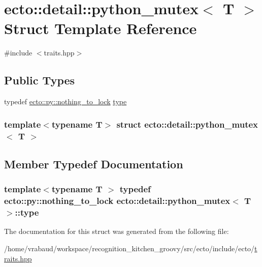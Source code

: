 \hypertarget{structecto_1_1detail_1_1python__mutex}{\section{ecto\-:\-:detail\-:\-:python\-\_\-mutex$<$ \-T $>$ \-Struct \-Template \-Reference}
\label{structecto_1_1detail_1_1python__mutex}
}


{\ttfamily \#include $<$traits.\-hpp$>$}

\subsection*{\-Public \-Types}
\begin{DoxyCompactItemize}
\item 
typedef \hyperlink{classecto_1_1py_1_1nothing__to__lock}{ecto\-::py\-::nothing\-\_\-to\-\_\-lock} \hyperlink{structecto_1_1detail_1_1python__mutex_af0a9d3c8b5d8ad0e8f8584101a197fa5}{type}
\end{DoxyCompactItemize}
\subsubsection*{template$<$typename T$>$ struct ecto\-::detail\-::python\-\_\-mutex$<$ T $>$}



\subsection{\-Member \-Typedef \-Documentation}
\hypertarget{structecto_1_1detail_1_1python__mutex_af0a9d3c8b5d8ad0e8f8584101a197fa5}{
\subsubsection[{type}]{\setlength{\rightskip}{0pt plus 5cm}template$<$typename T $>$ typedef {\bf ecto\-::py\-::nothing\-\_\-to\-\_\-lock} {\bf ecto\-::detail\-::python\-\_\-mutex}$<$ \-T $>$\-::{\bf type}}}\label{structecto_1_1detail_1_1python__mutex_af0a9d3c8b5d8ad0e8f8584101a197fa5}


\-The documentation for this struct was generated from the following file\-:\begin{DoxyCompactItemize}
\item 
/home/vrabaud/workspace/recognition\-\_\-kitchen\-\_\-groovy/src/ecto/include/ecto/\hyperlink{traits_8hpp}{traits.\-hpp}\end{DoxyCompactItemize}

